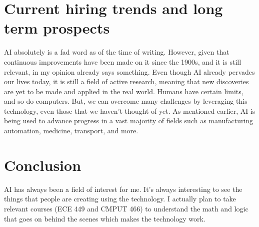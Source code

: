 \documentclass[letterpaper,12pt]{article}
\begin{document}
\section{Current hiring trends and long term prospects}

AI absolutely is a fad word as of the time of writing. However, given that continuous improvements
have been made on it since the 1900s, and it is still relevant, in my opinion already says something.
Even though AI already pervades our lives today,
it is still a field of active research\cite{uofaAI}, meaning that new
discoveries are yet to be made and applied in the real world.
Humans have certain limits, and so do computers. But, we can overcome many challenges by leveraging this technology,
even those that we haven't thought of yet. 
As mentioned earlier,
AI is being used to advance progress in a vast majority of fields
such as manufacturing automation, medicine, transport, and more.



\section{Conclusion}

AI has always been a field of interest for me.
It's always interesting to see the things that people are creating
using the technology. I actually plan to take relevant courses (ECE 449 and CMPUT 466)
to understand the math and logic that goes on behind the scenes
which makes the technology work.


\singlespacing
\nocite{*}
\printbibliography
% 
% 
\end{document}
